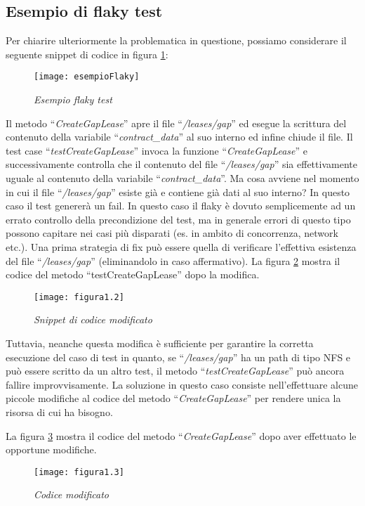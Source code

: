 \subsection{Esempio di flaky test}

Per chiarire ulteriormente la problematica in questione, possiamo considerare il seguente snippet di codice in figura \ref{fig:fig1.1}:
\begin{figure}[h]
	\centering
	\texttt{[image: esempioFlaky]}
	\caption{\emph{Esempio flaky test}}
	\label{fig:fig1.1}
\end{figure}

Il metodo “\emph{CreateGapLease}” apre il file “\emph{/leases/gap}” ed esegue la scrittura del contenuto della variabile “\emph{contract\_data}” al suo interno ed infine chiude il file.
Il test case “\emph{testCreateGapLease}” invoca la funzione “\emph{CreateGapLease}” e successivamente controlla che il contenuto del file “\emph{/leases/gap}” sia effettivamente
uguale al contenuto della variabile “\emph{contract\_data}”.
Ma cosa avviene nel momento in cui il file “\emph{/leases/gap}” esiste già e contiene già dati al suo interno? In questo caso il test genererà un fail. In questo caso il flaky
è dovuto semplicemente ad un errato controllo della precondizione del test, ma in generale errori di questo tipo possono capitare nei casi più disparati (es. in ambito di concorrenza, network etc.).
Una prima strategia di fix può essere quella di verificare l’effettiva esistenza del file “\emph{/leases/gap}” (eliminandolo in caso affermativo).
La figura \ref{fig:fig1.2} mostra il codice del metodo “testCreateGapLease” dopo la modifica.
\begin{figure}[h]
	\centering
	\texttt{[image: figura1.2]}
	\caption{\emph{Snippet di codice modificato}}
	\label{fig:fig1.2}
\end{figure}

Tuttavia, neanche questa modifica è sufficiente per garantire la corretta esecuzione del caso di test in quanto, se “\emph{/leases/gap}” ha un path di tipo NFS e può essere scritto da un altro test, il metodo “\emph{testCreateGapLease}” può ancora fallire improvvisamente. La soluzione in questo caso consiste nell’effettuare alcune piccole modifiche al codice del metodo “\emph{CreateGapLease}” per rendere unica la
risorsa di cui ha bisogno.

La figura \ref{fig:fig.1.3} mostra il codice del metodo “\emph{CreateGapLease}” dopo aver effettuato le opportune modifiche.
\newpage
\begin{figure}[h!]
	\centering
	\texttt{[image: figura1.3]}
	\caption{\emph{Codice modificato}}
	\label{fig:fig.1.3}
\end{figure}


